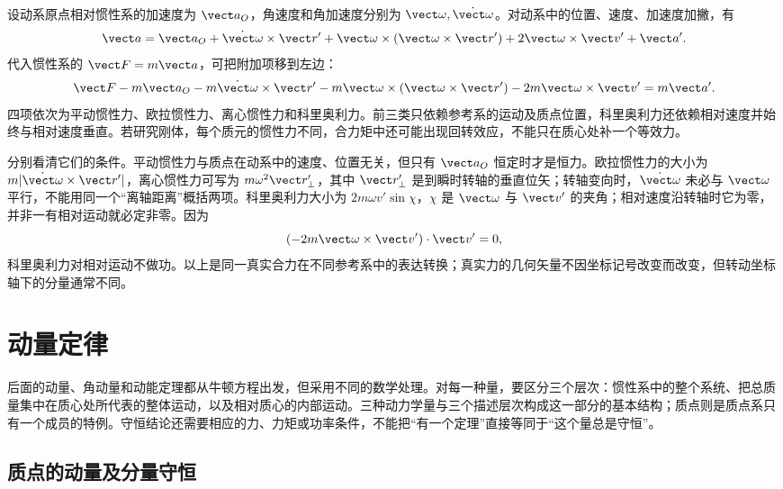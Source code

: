 设动系原点相对惯性系的加速度为 $\vect a_O$，角速度和角加速度分别为 $\vect\omega,\dot{\vect\omega}$。对动系中的位置、速度、加速度加撇，有
\begin{equation}
 \vect a=\vect a_O+\dot{\vect\omega}\times\vect r'
 +\vect\omega\times(\vect\omega\times\vect r')
 +2\vect\omega\times\vect v'+\vect a'.
 \label{r2ch02:eq:006}
\end{equation}
代入惯性系的 $\vect F=m\vect a$，可把附加项移到左边：
\begin{equation}
 \vect F-m\vect a_O-m\dot{\vect\omega}\times\vect r'
 -m\vect\omega\times(\vect\omega\times\vect r')
 -2m\vect\omega\times\vect v'=m\vect a'.
 \label{r2ch02:eq:007}
\end{equation}
四项依次为平动惯性力、欧拉惯性力、离心惯性力和科里奥利力。前三类只依赖参考系的运动及质点位置，科里奥利力还依赖相对速度并始终与相对速度垂直。若研究刚体，每个质元的惯性力不同，合力矩中还可能出现回转效应，不能只在质心处补一个等效力。

分别看清它们的条件。平动惯性力与质点在动系中的速度、位置无关，但只有 $\vect a_O$ 恒定时才是恒力。欧拉惯性力的大小为 $m|\dot{\vect\omega}\times\vect r'|$，离心惯性力可写为 $m\omega^2\vect r_\perp'$，其中 $\vect r_\perp'$ 是到瞬时转轴的垂直位矢；转轴变向时，$\dot{\vect\omega}$ 未必与 $\vect\omega$ 平行，不能用同一个“离轴距离”概括两项。科里奥利力大小为 $2m\omega v'\sin\chi$，$\chi$ 是 $\vect\omega$ 与 $\vect v'$ 的夹角；相对速度沿转轴时它为零，并非一有相对运动就必定非零。因为
\[
 (-2m\vect\omega\times\vect v')\cdot\vect v'=0,
\]
科里奥利力对相对运动不做功。以上是同一真实合力在不同参考系中的表达转换；真实力的几何矢量不因坐标记号改变而改变，但转动坐标轴下的分量通常不同。

\section{动量定律}
\label{r2ch02:sec:momentum}

后面的动量、角动量和动能定理都从牛顿方程出发，但采用不同的数学处理。对每一种量，要区分三个层次：惯性系中的整个系统、把总质量集中在质心处所代表的整体运动，以及相对质心的内部运动。三种动力学量与三个描述层次构成这一部分的基本结构；质点则是质点系只有一个成员的特例。守恒结论还需要相应的力、力矩或功率条件，不能把“有一个定理”直接等同于“这个量总是守恒”。

\subsection{质点的动量及分量守恒}
\label{r2ch02:sec:point-momentum}

